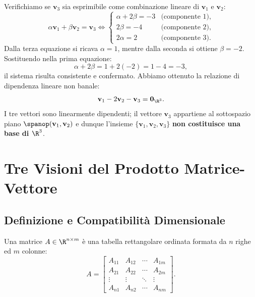 Verifichiamo se $\mathbf{v}_3$ sia esprimibile come combinazione lineare di $\mathbf{v}_1$ e $\mathbf{v}_2$:
\begin{equation}
    \alpha \mathbf{v}_1 + \beta \mathbf{v}_2 = \mathbf{v}_3 \iff \begin{cases}
        \alpha + 2\beta = -3 & \text{(componente 1)}, \\
        2\beta = -4 & \text{(componente 2)}, \\
        2\alpha = 2 & \text{(componente 3)}.
    \end{cases}
\end{equation}
Dalla terza equazione si ricava $\alpha = 1$, mentre dalla seconda si ottiene $\beta = -2$. Sostituendo nella prima equazione:
\begin{equation}
    \alpha + 2\beta = 1 + 2(-2) = 1 - 4 = -3,
\end{equation}
il sistema risulta consistente e confermato. Abbiamo ottenuto la relazione di dipendenza lineare non banale:
\begin{equation}
    \mathbf{v}_1 - 2\mathbf{v}_2 - \mathbf{v}_3 = \mathbf{0}_{\R^3}.
\end{equation}
I tre vettori sono linearmente dipendenti; il vettore $\mathbf{v}_3$ appartiene al sottospazio piano $\spanop(\mathbf{v}_1, \mathbf{v}_2)$ e dunque l'insieme $\{\mathbf{v}_1, \mathbf{v}_2, \mathbf{v}_3\}$ \textbf{non costituisce una base di $\R^3$}.

\FloatBarrier
\section{Tre Visioni del Prodotto Matrice-Vettore}

\subsection{Definizione e Compatibilità Dimensionale}

Una matrice $A \in \R^{n \times m}$ è una tabella rettangolare ordinata formata da $n$ righe ed $m$ colonne:
\begin{equation}
    A = \begin{bmatrix}
        A_{11} & A_{12} & \cdots & A_{1m} \\
        A_{21} & A_{22} & \cdots & A_{2m} \\
        \vdots & \vdots & \ddots & \vdots \\
        A_{n1} & A_{n2} & \cdots & A_{nm}
    \end{bmatrix}.
\end{equation}

